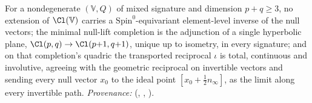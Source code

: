 For a nondegenerate $(\mathbb{V}, Q)$ of mixed signature and dimension $p + q \geq 3$, no extension of $\Cl(\mathbb{V})$ carries a $\mathrm{Spin}^{0}$-equivariant element-level inverse of the null vectors; the minimal null-lift completion is the adjunction of a single hyperbolic plane, $\Cl(p,q) \to \Cl(p{+}1,q{+}1)$, unique up to isometry, in every signature; and on that completion's quadric the transported reciprocal $\iota$ is total, continuous and involutive, agreeing with the geometric reciprocal on invertible vectors and sending every null vector $x_{0}$ to the ideal point $[x_{0} + \tfrac12 n_{\infty}]$, as the limit along every invertible path. \emph{Provenance:} \cite[Thms.~4.2, 4.10, 4.13]{ButlerT1} (, , ).
